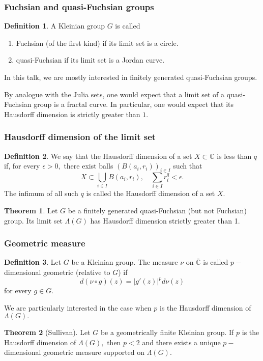 \documentclass{beamer}
\theoremstyle{definition}
\newtheorem{defi}{Definition}
\newtheorem{thm}{Theorem}
\begin{document}
\begin{frame}
\frametitle{Fuchsian and quasi-Fuchsian groups}

\begin{defi} A Kleinian group $G$ is called
\begin{enumerate}[{\rm (a)}]
\item Fuchsian (of the first kind) if its limit set is a circle.
\item quasi-Fuchsian if its limit set is a Jordan curve.
\end{enumerate}
\end{defi}

In this talk, we are mostly interested in finitely generated quasi-Fuchsian groups.

By analogue with the Julia sets, one would expect that a limit set of a quasi-Fuchsian group is a fractal curve. In particular, one would expect that its Hausdorff dimension is strictly greater than $1.$

\end{frame}

\begin{frame}
\frametitle{Hausdorff dimension of the limit set}

\begin{defi} We say that the Hausdorff dimension of a set $X\subset\mathbb{C}$ is less than $q$ if, for every $\epsilon>0,$ there exist balls $(B(a_i,r_i))_{i\in I}$ such that 
$$X\subset\bigcup_{i\in I}B(a_i,r_i),\quad \sum_{i\in I}r_i^q<\epsilon.$$
The infimum of all such $q$ is called the Hausdorff dimension of a set $X.$
\end{defi}

\begin{thm} Let $G$ be a finitely generated quasi-Fuchsian (but not Fuchsian) group. Its limit set $\Lambda(G)$ has Hausdorff dimension strictly greater than 1.
\end{thm}
\end{frame}


\begin{frame}
\frametitle{Geometric measure}

\begin{defi} Let $G$ be a Kleinian group. The measure $\nu$ on $\bar{\mathbb{C}}$ is called $p-$dimensional geometric (relative to $G$) if 
$$d(\nu\circ g)(z)=|g'(z)|^pd\nu(z)$$
for every $g\in G.$
\end{defi}

We are particularly interested in the case when $p$ is the Hausdorff dimension of $\Lambda(G).$

\begin{thm} [Sullivan] Let $G$ be a geometrically finite Kleinian group. If $p$ is the Hausdorff dimension of $\Lambda(G),$ then $p<2$ and there exists a unique $p-$dimensional geometric measure supported on $\Lambda(G).$ 
\end{thm}
\end{frame}
\end{document}
